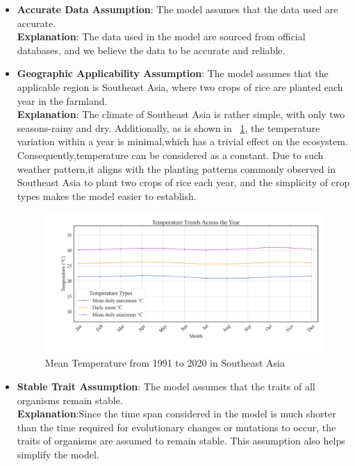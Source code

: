 \documentclass{HZNUMCM}
\begin{document}
      \begin{itemize}
        \item \textbf{Accurate Data Assumption}: The model assumes that the data used are accurate.\\
        \textbf{Explanation}: The data used in the model are sourced from official databases, and we believe the data to be accurate and reliable.
        
        \item \textbf{Geographic Applicability Assumption}: The model assumes that the applicable region is Southeast Asia,
         where two crops of rice are planted each year in the farmland.\\
        \textbf{Explanation}: The climate of Southeast Asia is rather simple, 
        with only two seasons-rainy and dry. Additionally, as is shown in \figurename~\ref{fig:Temperature},
        the temperature variation within a year is minimal,which has a trivial effect on the ecosystem.
        Consequently,temperature can be considered as a constant.
        Due to such weather pattern,it aligns with the planting patterns commonly observed in Southeast Asia to plant two crops of rice each year,
         and the simplicity of crop types makes the model easier to establish.
        
        \begin{figure}[H]
          \centering
          \includegraphics[width=\linewidth]{images/AverTemper.png}
          \caption{Mean Temperature from 1991 to 2020 in Southeast Asia}
          \label{fig:Temperature}
        \end{figure}

        \item \textbf{Stable Trait Assumption}: The model assumes that the traits of all organisms remain stable.\\
        \textbf{Explanation}:Since the time span considered in the model is much shorter than the time required for evolutionary changes or mutations to occur,
         the traits of organisms are assumed to remain stable. This assumption also helps simplify the model.
        

\end{itemize}
\end{document}
